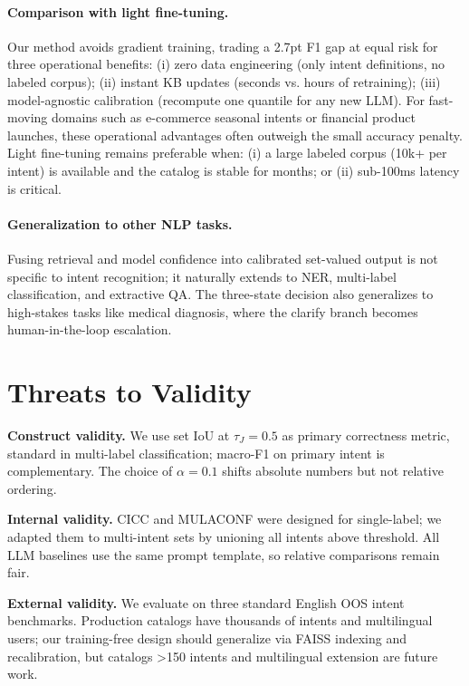 \documentclass[sigconf, anonymous, review]{acmart}
\begin{document}
\paragraph{Comparison with light fine-tuning.}
Our method avoids gradient training, trading a 2.7pt F1 gap at equal risk for three operational benefits: (i) zero data engineering (only intent definitions, no labeled corpus); (ii) instant KB updates (seconds vs. hours of retraining); (iii) model-agnostic calibration (recompute one quantile for any new LLM). For fast-moving domains such as e-commerce seasonal intents or financial product launches, these operational advantages often outweigh the small accuracy penalty. Light fine-tuning remains preferable when: (i) a large labeled corpus (10k+ per intent) is available and the catalog is stable for months; or (ii) sub-100ms latency is critical.

\paragraph{Generalization to other NLP tasks.}
Fusing retrieval and model confidence into calibrated set-valued output is not specific to intent recognition; it naturally extends to NER, multi-label classification, and extractive QA. The three-state decision also generalizes to high-stakes tasks like medical diagnosis, where the clarify branch becomes human-in-the-loop escalation.

\section{Threats to Validity}

\textbf{Construct validity.} We use set IoU at $\tau_J=0.5$ as primary correctness metric, standard in multi-label classification; macro-F1 on primary intent is complementary. The choice of $\alpha=0.1$ shifts absolute numbers but not relative ordering.

\textbf{Internal validity.} CICC and MULACONF were designed for single-label; we adapted them to multi-intent sets by unioning all intents above threshold. All LLM baselines use the same prompt template, so relative comparisons remain fair.

\textbf{External validity.} We evaluate on three standard English OOS intent benchmarks. Production catalogs have thousands of intents and multilingual users; our training-free design should generalize via FAISS indexing and recalibration, but catalogs >150 intents and multilingual extension are future work.
\end{document}
